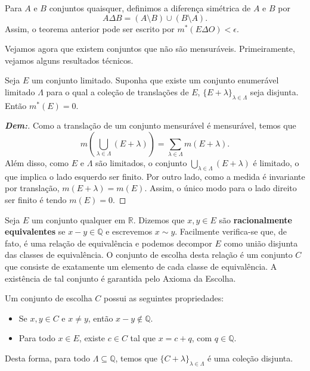 Para $A$ e $B$ conjuntos quaisquer, definimos a diferença simétrica de $A$ e $B$ 
por $$A \Delta B = (A \setminus B) \cup (B \setminus A).$$ 
Assim, o teorema anterior pode ser escrito por $m^*(E \Delta O) < \epsilon$.


Vejamos agora que existem conjuntos que não são mensuráveis. Primeiramente, vejamos alguns resultados técnicos.

\begin{lemma*}{}
Seja $E$ um conjunto limitado. Suponha que existe um conjunto enumerável limitado $\Lambda$ para o qual a coleção de translações de $E$, $\{E + \lambda\}_{\lambda \in \Lambda}$ seja disjunta. Então $m^*(E) = 0$.
\end{lemma*}

\begin{proof}[\textbf{Dem:}]
Como a translação de um conjunto mensurável é mensurável, temos que
$$ m\left(\bigcup_{\lambda \in \Lambda} (E + \lambda)\right) = \sum_{\lambda \in \Lambda} m(E + \lambda). $$
Além disso, como $E$ e $\Lambda$ são limitados, o conjunto $\bigcup_{\lambda \in \Lambda} (E + \lambda)$ é limitado, o que implica o lado esquerdo ser finito.
Por outro lado, como a medida é invariante por translação, $m(E + \lambda) = m(E)$. Assim, o único modo para o lado direito ser finito é tendo $m(E) = 0$.
\end{proof}

Seja $E$ um conjunto qualquer em $\mathbb{R}$. Dizemos que $x, y \in E$ são \textbf{racionalmente equivalentes} se $x - y \in \mathbb{Q}$ e escrevemos $x \sim y$. 
Facilmente verifica-se que, de fato, é uma relação de equivalência e podemos decompor $E$ como união disjunta das classes de equivalência.
O conjunto de escolha desta relação é um conjunto $C$ que consiste de exatamente um elemento de cada classe de equivalência. A existência de tal conjunto é garantida pelo Axioma da Escolha.

Um conjunto de escolha $C$ possui as seguintes propriedades:
\begin{itemize}
    \item[i)] Se $x, y \in C$ e $x \neq y$, então $x - y \notin \mathbb{Q}$.
    \item[ii)] Para todo $x \in E$, existe $c \in C$ tal que $x = c + q$, com $q \in \mathbb{Q}$.
\end{itemize}
Desta forma, para todo $\Lambda \subseteq \mathbb{Q}$, temos que $\{C + \lambda\}_{\lambda \in \Lambda}$ é uma coleção disjunta.

